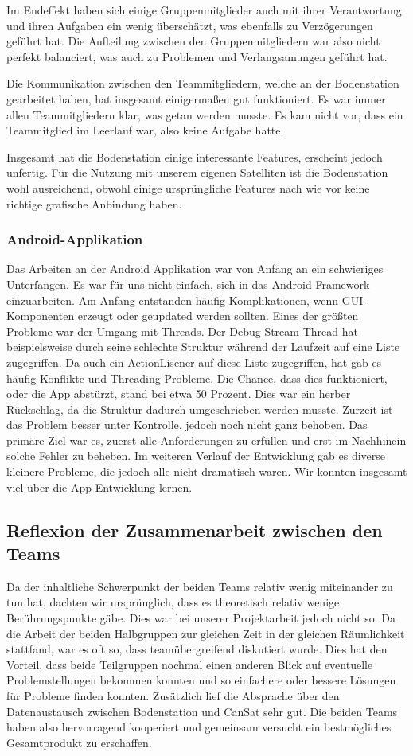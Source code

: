 Im Endeffekt haben sich einige Gruppenmitglieder auch mit ihrer Verantwortung und ihren Aufgaben ein wenig überschätzt, was ebenfalls zu Verzögerungen geführt hat. Die Aufteilung zwischen den Gruppenmitgliedern war also nicht perfekt balanciert, was auch zu Problemen und Verlangsamungen geführt hat.

Die Kommunikation zwischen den Teammitgliedern, welche an der Bodenstation gearbeitet haben, hat insgesamt einigermaßen gut funktioniert. Es war immer allen Teammitgliedern klar, was getan werden musste. Es kam nicht vor, dass ein Teammitglied im Leerlauf war, also keine Aufgabe hatte.

Insgesamt hat die Bodenstation einige interessante Features, erscheint jedoch unfertig. Für die Nutzung mit unserem eigenen Satelliten ist die Bodenstation wohl ausreichend, obwohl einige ursprüngliche Features nach wie vor keine richtige grafische Anbindung haben.

\subsubsection{Android-Applikation}
Das Arbeiten an der Android Applikation war von Anfang an ein schwieriges Unterfangen. Es war für uns nicht einfach, sich in das Android Framework einzuarbeiten. Am Anfang entstanden häufig Komplikationen, wenn GUI-Komponenten erzeugt oder geupdated werden sollten. Eines der größten Probleme war der Umgang mit Threads. Der Debug-Stream-Thread hat beispielsweise durch seine schlechte Struktur während der Laufzeit auf eine Liste zugegriffen. Da auch ein ActionLisener auf diese Liste zugegriffen, hat gab es häufig Konflikte und Threading-Probleme. Die Chance, dass dies funktioniert, oder die App abstürzt, stand bei etwa 50 Prozent. Dies war ein herber Rückschlag, da die Struktur dadurch umgeschrieben werden musste. Zurzeit ist das Problem besser unter Kontrolle, jedoch noch nicht ganz behoben. Das primäre Ziel war es, zuerst alle Anforderungen zu erfüllen und erst im Nachhinein solche Fehler zu beheben. Im weiteren Verlauf der Entwicklung gab es diverse kleinere Probleme, die jedoch alle nicht dramatisch waren. Wir konnten insgesamt viel über die App-Entwicklung lernen.

\subsection{Reflexion der Zusammenarbeit zwischen den Teams}
Da der inhaltliche Schwerpunkt der beiden Teams relativ wenig miteinander zu tun hat, dachten wir ursprünglich, dass es theoretisch relativ wenige Berührungspunkte gäbe. Dies war bei unserer Projektarbeit jedoch nicht so. Da die Arbeit der beiden Halbgruppen zur gleichen Zeit in der gleichen Räumlichkeit stattfand, war es oft so, dass teamübergreifend diskutiert wurde. Dies hat den Vorteil, dass beide Teilgruppen nochmal einen anderen Blick auf eventuelle Problemstellungen bekommen konnten und so einfachere oder bessere Lösungen für Probleme finden konnten. Zusätzlich lief die Absprache über den Datenaustausch zwischen Bodenstation und CanSat sehr gut. Die beiden Teams haben also hervorragend kooperiert und gemeinsam versucht ein bestmögliches Gesamtprodukt zu erschaffen.
